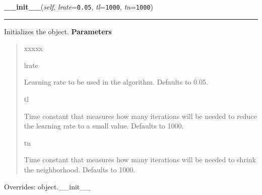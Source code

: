 \hspace{.8\funcindent}\begin{boxedminipage}{\funcwidth}

    \raggedright \textbf{\_\_init\_\_}(\textit{self}, \textit{lrate}={\tt 0.05}, \textit{tl}={\tt 1000}, \textit{tn}={\tt 1000})

    \vspace{-1.5ex}

    \rule{\textwidth}{0.5\fboxrule}
\setlength{\parskip}{2ex}

Initializes the object.
\setlength{\parskip}{1ex}
      \textbf{Parameters}
      \vspace{-1ex}

      \begin{quote}
        \begin{Ventry}{xxxxx}

          \item[lrate]


Learning rate to be used in the algorithm. Defaults to 0.05.
          \item[tl]


Time constant that measures how many iterations will be needed to
reduce the learning rate to a small value. Defaults to 1000.
          \item[tn]


Time constant that measures how many iterations will be needed to
shrink the neighborhood. Defaults to 1000.
        \end{Ventry}

      \end{quote}

      Overrides: object.\_\_init\_\_

    \end{boxedminipage}

    \vspace{0.5ex}

